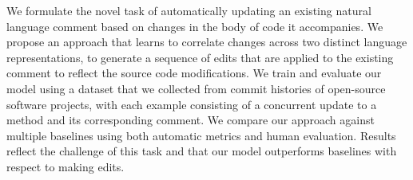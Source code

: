We formulate the novel task of automatically updating an existing natural language comment based on changes in the body of code it accompanies. We propose an approach that learns to correlate changes across two distinct language representations, to generate a sequence of edits that are applied to the existing comment to reflect the source code modifications. We train and evaluate our model using a dataset that we collected from commit histories of open-source software projects, with each example consisting of a concurrent update to a method and its corresponding comment. We compare our approach against multiple baselines using both automatic metrics and human evaluation. Results reflect the challenge of this task and that our model outperforms baselines with respect to making edits.
